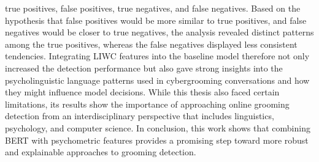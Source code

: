 true positives, false positives, true negatives, and false negatives. Based on the hypothesis that false positives would be more similar to true positives, and false negatives would be closer to true negatives, the analysis revealed distinct patterns among the true positives, whereas the false negatives displayed less consistent tendencies. Integrating LIWC features into the baseline model therefore not only increased the detection performance but also gave strong insights into the psycholinguistic language patterns used in cybergrooming conversations and how they might influence model decisions. While this thesis also faced certain limitations, its results show the importance of approaching online grooming detection from an interdisciplinary perspective that includes linguistics, psychology, and computer science.  In conclusion, this work shows that combining BERT with psychometric features provides a promising step toward more robust and explainable approaches to grooming detection.